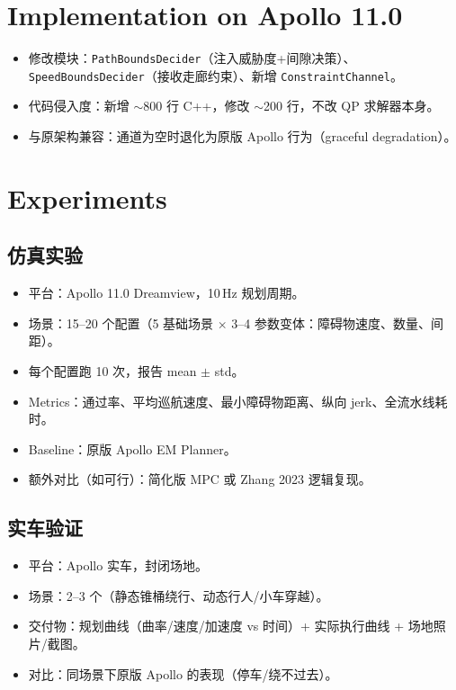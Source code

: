 \documentclass[a4paper,12pt]{article}
\begin{document}
\section{Implementation on Apollo 11.0}

\begin{itemize}
  \item 修改模块：\texttt{PathBoundsDecider}（注入威胁度+间隙决策）、
        \texttt{SpeedBoundsDecider}（接收走廊约束）、新增 \texttt{ConstraintChannel}。
  \item 代码侵入度：新增 $\sim$800 行 C++，修改 $\sim$200 行，不改 QP 求解器本身。
  \item 与原架构兼容：通道为空时退化为原版 Apollo 行为（graceful degradation）。
\end{itemize}

\section{Experiments}

\subsection{仿真实验}

\begin{itemize}
  \item 平台：Apollo 11.0 Dreamview，10\,Hz 规划周期。
  \item 场景：15--20 个配置（5 基础场景 $\times$ 3--4 参数变体：障碍物速度、数量、间距）。
  \item 每个配置跑 10 次，报告 mean $\pm$ std。
  \item Metrics：通过率、平均巡航速度、最小障碍物距离、纵向 jerk、全流水线耗时。
  \item Baseline：原版 Apollo EM Planner。
  \item 额外对比（如可行）：简化版 MPC 或 Zhang 2023 逻辑复现。
\end{itemize}

\subsection{实车验证}

\begin{itemize}
  \item 平台：Apollo 实车，封闭场地。
  \item 场景：2--3 个（静态锥桶绕行、动态行人/小车穿越）。
  \item 交付物：规划曲线（曲率/速度/加速度 vs 时间）+ 实际执行曲线 + 场地照片/截图。
  \item 对比：同场景下原版 Apollo 的表现（停车/绕不过去）。
\end{itemize}
\end{document}
